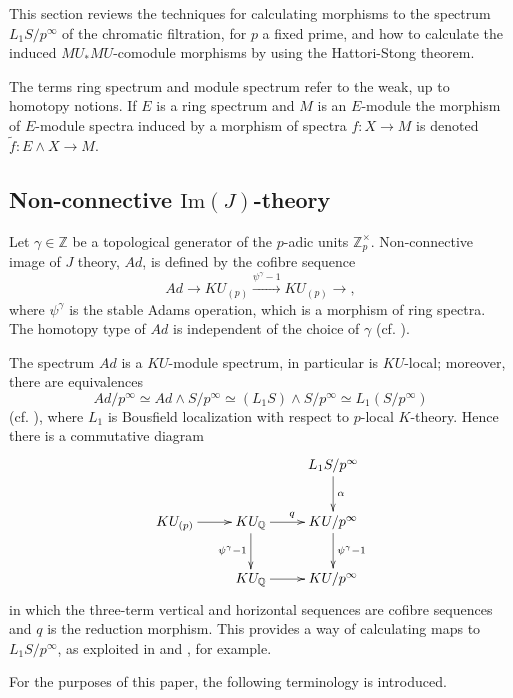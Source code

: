 \documentclass[10pt,a4paper]{amsart}
\theoremstyle{definition}
\theoremstyle{remark}
\newcommand{\zed}{\mathbb{Z}}
\newcommand{\rat}{\mathbb{Q}}
\newcommand{\padics}{\zed_p}
\newcommand{\imj}{{Ad}}
\renewcommand{\smash}{\wedge}
\begin{document}
This section reviews the techniques for calculating morphisms to the spectrum $L_1 S /p^\infty$ of the
chromatic filtration, for $p$ a fixed prime,  and how to calculate the induced $MU_*MU$-comodule morphisms by  using the Hattori-Stong
theorem.

The terms ring spectrum and module spectrum refer to the weak, up to homotopy notions. If $E$ is
a ring spectrum and $M$ is an $E$-module the morphism of
$E$-module spectra induced by a morphism of spectra $f : X \rightarrow M$ is denoted $\tilde{f} : E \smash X \rightarrow M$.



\subsection{Non-connective $\mathrm{Im}(J)$-theory}



Let $\gamma \in \zed$ be  a topological generator of the $p$-adic
units $\padics^\times$. Non-connective image of $J$ theory, $\imj$, is
defined by the cofibre
sequence
\[
 \imj
\rightarrow
KU_{(p)}
\stackrel{\psi^\gamma -1} {\rightarrow}
KU_{(p)}
\rightarrow ,
\]
where $\psi^\gamma$ is the stable Adams operation, which is a morphism of ring spectra. The homotopy type of $\imj$ is independent of the choice
 of $\gamma$ (cf. \cite{knapp}).

The spectrum $\imj$ is a $KU$-module spectrum, in particular is
$KU$-local; moreover, there are  equivalences
\[
 \imj / p^\infty
 \simeq
\imj \smash S/p^\infty
\simeq
(L_1 S) \smash S/p^\infty
\simeq
L_1 (S/p^\infty)
\]
(cf. \cite[Lemma 8.7]{ravenel}), where  $L_
1$  is Bousfield localization with respect to $p$-local $K$-theory. Hence there
is a commutative diagram
\begin{eqnarray}
\label{eqn:Ad_cofibre_seq}
 \xymatrix{
&& L_1 S/p^\infty
\ar[d]^\alpha
\\
KU_{(p)}
\ar[r]
&
KU _\rat
\ar[r]^q
\ar[d]_{\psi^\gamma -1}
&
KU /p^\infty
\ar[d]^{\psi^\gamma - 1}
\\
&
KU_\rat
\ar[r]
&
KU /p^\infty
}
\end{eqnarray}
in which the three-term vertical and horizontal sequences are cofibre
sequences and $q$ is the reduction morphism. This provides a way of calculating maps to $L_1 S / p^\infty$,
as exploited in \cite[Section 5]{BCGHRW} and \cite{imaoka}, for example.

For the purposes of this paper, the following terminology is introduced.
\end{document}
